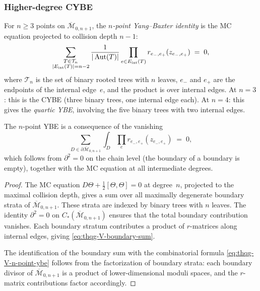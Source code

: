 \subsubsection{Higher-degree CYBE}

\begin{definition}
\label{def:thqg-V-n-point-ybe}
For $n \geq 3$ points on $\overline{\mathcal{M}}_{0,n+1}$, the
\emph{$n$-point Yang--Baxter identity} is the MC equation projected
to collision depth $n - 1$:
\begin{equation}\label{eq:thqg-V-n-point-ybe}
\sum_{\substack{T \in \mathcal{T}_n \\
 |E_{\mathrm{int}}(T)| = n-2}}
\frac{1}{|\operatorname{Aut}(T)|}
\prod_{e \in E_{\mathrm{int}}(T)}
r_{e_-,e_+}(z_{e_-,e_+})
\;=\; 0,
\end{equation}
where $\mathcal{T}_n$ is the set of binary rooted trees with $n$
leaves, $e_-$ and $e_+$ are the endpoints of the internal edge~$e$,
and the product is over internal edges.
At $n = 3$: this is the CYBE (three binary trees, one internal edge
each).
At $n = 4$: this gives the \emph{quartic YBE}, involving the
five binary trees with two internal edges.
\end{definition}

\begin{proposition}
\label{prop:thqg-V-n-point-ybe-proof}
The $n$-point YBE is a consequence of the vanishing
\begin{equation}\label{eq:thqg-V-boundary-sum}
\sum_{D \in \partial\overline{\mathcal{M}}_{0,n+1}}
\int_D
\prod_{e}
r_{e_-,e_+}(z_{e_-,e_+})
\;=\; 0,
\end{equation}
which follows from $\partial^2 = 0$ on the chain level
\textup{(}the boundary of a boundary is empty\textup{)}, together
with the MC equation at all intermediate degrees.
\end{proposition}

\begin{proof}
The MC equation $D\Theta + \tfrac{1}{2}[\Theta,\Theta] = 0$ at
degree~$n$, projected to the maximal collision depth, gives a sum over
all maximally degenerate boundary strata of
$\overline{\mathcal{M}}_{0,n+1}$. These strata are indexed by binary
trees with $n$ leaves. The identity $\partial^2 = 0$ on
$C_*(\overline{\mathcal{M}}_{0,n+1})$ ensures that the total
boundary contribution vanishes. Each boundary stratum contributes a
product of $r$-matrices along internal edges, giving
\eqref{eq:thqg-V-boundary-sum}.

The identification of the boundary sum with the combinatorial formula
\eqref{eq:thqg-V-n-point-ybe} follows from the factorization of
boundary strata: each boundary divisor of $\overline{\mathcal{M}}_{0,n+1}$
is a product of lower-dimensional moduli spaces, and the $r$-matrix
contributions factor accordingly.
\end{proof}


